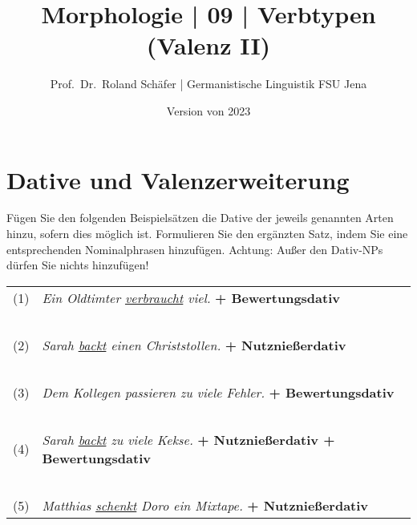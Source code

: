 \documentclass[12pt,a4paper,twoside]{article}
\author{Prof.\ Dr.\ Roland Schäfer | Germanistische Linguistik FSU Jena}
\title{Morphologie | 09 | Verbtypen (Valenz II)}
\date{Version von 2023}
\newcommand{\Zeile}{\vspace{\baselineskip}}
\begin{document}
\maketitle

\Zeile

\section{Dative und Valenzerweiterung}\label{sec:dative}

Fügen Sie den folgenden Beispielsätzen die Dative der jeweils genannten Arten hinzu, sofern dies möglich ist.
Formulieren Sie den ergänzten Satz, indem Sie eine entsprechenden Nominalphrasen hinzufügen.
Achtung: Außer den Dativ-NPs dürfen Sie nichts hinzufügen!

\begin{center}
  \begin{longtable}[h]{cp{}}
    (1)  & \textit{Ein Oldtimter \ul{verbraucht} viel.} \textbf{+ Bewertungsdativ}\\
    &\\
    &\\\cline{2-2}
    &\\
    &\\\cline{2-2}
    &\\
    (2)  & \textit{Sarah \ul{backt} einen Christstollen.} \textbf{+ Nutznießerdativ}\\
    &\\
    &\\\cline{2-2}
    &\\
    &\\\cline{2-2}
    &\\
    (3)  & \textit{Dem Kollegen passieren zu viele Fehler.} \textbf{+ Bewertungsdativ}\\
    &\\
    &\\\cline{2-2}
    &\\
    &\\\cline{2-2}
    &\\
    (4)  & \textit{Sarah \ul{backt} zu viele Kekse.} \textbf{+ Nutznießerdativ + Bewertungsdativ}\\
    &\\
    &\\\cline{2-2}
    &\\
    &\\\cline{2-2}
    &\\
    (5)  & \textit{Matthias \ul{schenkt} Doro ein Mixtape.} \textbf{+ Nutznießerdativ}\\

\end{longtable}
\end{center}
\end{document}
